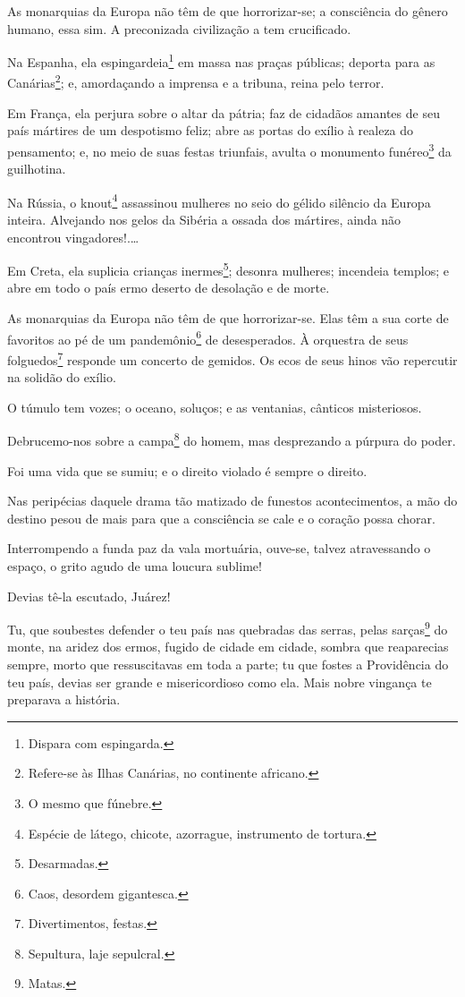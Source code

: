As monarquias da Europa não têm de que horrorizar-se; a consciência do
gênero humano, essa sim. A preconizada civilização a tem crucificado.

Na Espanha, ela espingardeia\footnote{Dispara com espingarda.} em
massa nas praças públicas; deporta para as Canárias\footnote{Refere-se
  às Ilhas Canárias, no continente africano.}; e, amordaçando a imprensa
e a tribuna, reina pelo terror.

Em França, ela perjura sobre o altar da pátria; faz de cidadãos amantes
de seu país mártires de um despotismo feliz; abre as portas do exílio à
realeza do pensamento; e, no meio de suas festas triunfais, avulta o
monumento funéreo\footnote{O mesmo que fúnebre.} da guilhotina.

Na Rússia, o knout\footnote{Espécie de látego, chicote, azorrague,
  instrumento de tortura.} assassinou mulheres no seio do gélido
silêncio da Europa inteira. Alvejando nos gelos da Sibéria a ossada dos
mártires, ainda não encontrou vingadores!.\ldots{}

Em Creta, ela suplicia crianças inermes\footnote{Desarmadas.}; desonra
mulheres; incendeia templos; e abre em todo o país ermo deserto de
desolação e de morte.

As monarquias da Europa não têm de que horrorizar-se. Elas têm a sua
corte de favoritos ao pé de um pandemônio\footnote{Caos, desordem
  gigantesca.} de desesperados. À orquestra de seus folguedos\footnote{
  Divertimentos, festas.} responde um concerto de gemidos. Os ecos de
seus hinos vão repercutir na solidão do exílio.

O túmulo tem vozes; o oceano, soluços; e as ventanias, cânticos
misteriosos.

Debrucemo-nos sobre a campa\footnote{Sepultura, laje sepulcral.} do
homem, mas desprezando a púrpura do poder.

Foi uma vida que se sumiu; e o direito violado é sempre o direito.

Nas peripécias daquele drama tão matizado de funestos acontecimentos, a
mão do destino pesou de mais para que a consciência se cale e o coração
possa chorar.

Interrompendo a funda paz da vala mortuária, ouve-se, talvez
atravessando o espaço, o grito agudo de uma loucura sublime!

Devias tê-la escutado, Juárez!

Tu, que soubestes defender o teu país nas quebradas das serras, pelas
sarças\footnote{Matas.} do monte, na aridez dos ermos, fugido de
cidade em cidade, sombra que reaparecias sempre, morto que ressuscitavas
em toda a parte; tu que fostes a Providência do teu país, devias ser
grande e misericordioso como ela. Mais nobre vingança te preparava a
história.

